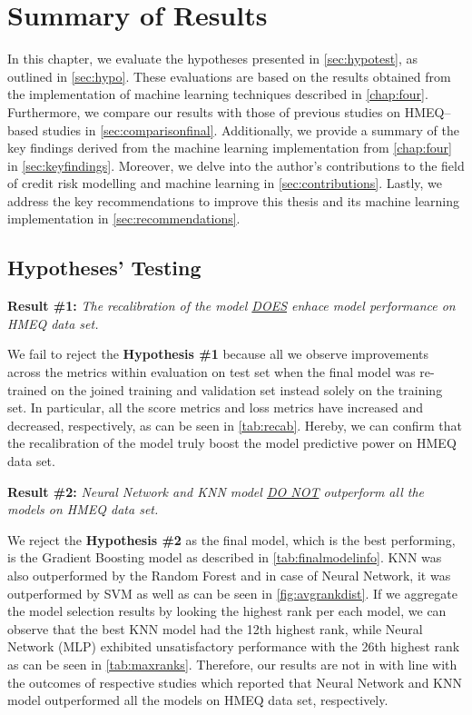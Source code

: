 \chapter{Summary of Results}
\label{chap:five}
In this chapter, we evaluate the hypotheses presented in \autoref{sec:hypotest}, as outlined in \autoref{sec:hypo}.
These evaluations are based on the results obtained from the implementation of machine learning techniques described in \autoref{chap:four}. 
Furthermore, we compare our results with those of previous studies on HMEQ--based studies \citep{serkan2021bagging,zurada2014classification} in \autoref{sec:comparisonfinal}.
Additionally, we provide a summary of the key findings derived from the machine learning implementation from \autoref{chap:four} in  \autoref{sec:keyfindings}. 
Moreover, we delve into the author's contributions to the field of credit risk modelling and machine learning in \autoref{sec:contributions}.
Lastly, we address the key recommendations to improve this thesis and its machine learning implementation in \autoref{sec:recommendations}.

\section{Hypotheses' Testing}
\label{sec:hypotest}
\noindent \textbf{Result \#1:} \textit{The recalibration of the model \underline{DOES} enhace model performance on HMEQ data set.}

We fail to reject the \textbf{Hypothesis \#1} because all we observe improvements across the metrics within evaluation on test set when the final model was re-trained on the joined training and validation set instead solely on the training set.
In particular, all the score metrics and loss metrics have increased and decreased, respectively, as can be seen in \autoref{tab:recab}. Hereby, we can confirm that the recalibration of the model truly boost the model predictive power on HMEQ data set.

\vspace{0.3cm}

\noindent \textbf{Result \#2:} \textit{Neural Network and KNN model \underline{DO NOT} outperform all the models on HMEQ data set.}

We reject the \textbf{Hypothesis \#2} as the final model, which is the best performing, is the Gradient Boosting model as described in \autoref{tab:finalmodelinfo}.
KNN was also outperformed by the Random Forest and in case of Neural Network, it was outperformed by SVM as well as can be seen in \autoref{fig:avgrankdist}.
If we aggregate the model selection results by looking the highest rank per each model, we can observe that the best KNN model had the 12th highest rank, while Neural Network (MLP) exhibited unsatisfactory performance with the 26th highest rank as can be seen in \autoref{tab:maxranks}.
Therefore, our results are not in with line with the outcomes of respective studies \citep{serkan2021bagging,zurada2014classification} which reported that Neural Network and KNN model outperformed all the models on HMEQ data set, respectively.

